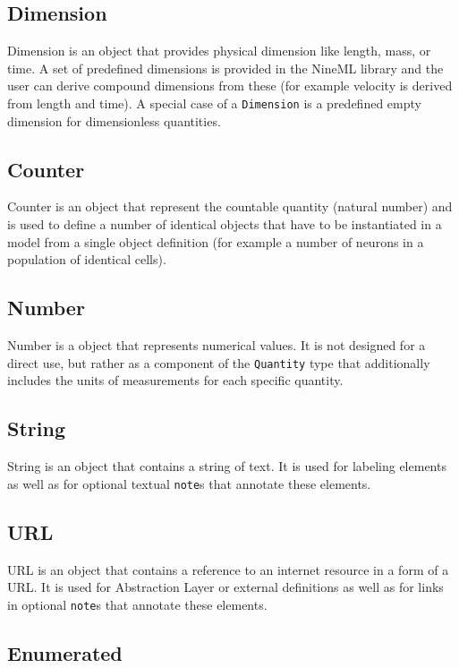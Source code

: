 \documentclass{article}
\begin{document}
\subsection{Dimension}

Dimension is an object that provides physical dimension like length,
mass, or time. A set of predefined dimensions is provided in the
NineML library and the user can derive compound dimensions from these
(for example velocity is derived from length and time). A special case
of a {\tt Dimension} is a predefined empty dimension for dimensionless
quantities.

\subsection{Counter}

Counter is an object that represent the countable quantity (natural
number) and is used to define a number of identical objects that have
to be instantiated in a model from a single object definition (for
example a number of neurons in a population of identical cells).

\subsection{Number}

Number is a object that represents numerical values. It is not designed for
a direct use, but rather as a component of the {\tt Quantity} type that
additionally includes the units of measurements for each specific quantity.

\subsection{String}

String is an object that contains a string of text. It is used for labeling
elements as well as for optional textual {\tt note}s that annotate these
elements.

\subsection{URL}

URL is an object that contains a reference to an internet resource in a form
of a URL. It is used for Abstraction Layer or external definitions as well as
for links in optional {\tt note}s that annotate these elements.

\subsection{Enumerated}
\end{document}
